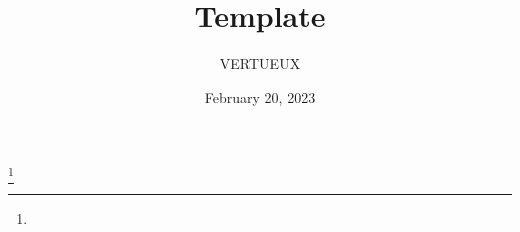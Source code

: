 \documentclass{psychologist_dilemma}
\begin{document}
\title[]{Template}

\author{VERTUEUX}
\thanks{}

\date{February 20, 2023}

\dedicatory{}

\begin{abstract}
\end{abstract}

\maketitle


\end{document}
